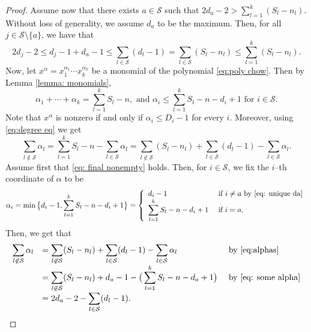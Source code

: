 \documentclass[11pt]{amsart}
\numberwithin{equation}{section}
\theoremstyle{plain}
\numberwithin{theorem}{section}
\theoremstyle{definition}
\begin{document}
\begin{proof}
  Assume now that there exists $a\in\mathcal S$ such that $2d_a-2>\sum_{l=1}^k(S_l-n_l)$. Without loss of generality, we assume $d_a$ to be the maximum.  Then, for all $j\in\mathcal S\setminus \{a\}$, we have that 
    \begin{equation}\label{eq: unique da}
   2d_j-2\le d_j-1+d_a-1\le\sum_{l\in\mathcal S}(d_l-1)=\sum_{l\in\mathcal S}(S_l-n_l)\le\sum_{l=1}^k(S_l-n_l).
    \end{equation}
    Now, let $x^{\alpha}=x_1^{\alpha_1}\cdots x_k^{\alpha_k}$ be a monomial of the polynomial \eqref{eq:poly chow}. Then by Lemma \ref{lemma: monomials},
    \begin{equation}
        \label{eq:degree eq}
         \alpha_1+\cdots+\alpha_k=\sum_{l=1}^k S_l-n, \text{ and }\alpha_i\leq \sum_{l=1}^k S_l-n-d_i+1 \text{ for } i\in\mathcal S.
    \end{equation}
    Note that $x^\alpha$ is nonzero if and only if $\alpha_i\leq D_i-1$ for every $i$.
    Moreover, using \eqref{eq:degree eq} we get \begin{equation}\label{eq:alphas}
    \sum_{l\not\in\mathcal S}\alpha_l=\sum_{l=1}^k S_l-n-\sum_{l\in\mathcal S}\alpha_l=\sum_{l\not\in\mathcal S} (S_l-n_l)+\sum_{l\in\mathcal S}(d_l-1)-\sum_{l\in\mathcal S}\alpha_l.
    \end{equation}
    Assume first that \eqref{eq: final nonempty} holds. Then, for $i\in\mathcal S$, we fix the $i$--th coordinate of $\alpha$ to be
    \begin{equation}
        \label{eq: some alpha}
        \alpha_i=\min\big\{d_i-1,\sum_{l=1}^k S_l-n-d_i+1\big\}=\left\{\begin{array}{ll}
             d_i-1&\text{ if }i\ne a\text{ by \eqref{eq: unique da}}\\
             \displaystyle\sum_{l=1}^k S_l-n-d_i+1&\text{ if }i=a.
        \end{array}\right.
    \end{equation}
        Then, we get that  
        \begin{equation}\label{eq: sum of alphas}
\begin{array}{lll}
  \displaystyle  \sum_{l\not\in\mathcal S}\alpha_l&  \displaystyle =\sum_{l\not\in\mathcal S} (S_l-n_l)+\sum_{l\in\mathcal S}(d_l-1)-\sum_{l\in\mathcal S}\alpha_l&\text{ by \eqref{eq:alphas}}\\
  &  \displaystyle =\sum_{l\not\in\mathcal S} (S_l-n_l)+d_a-1-\big(\sum_{l=1}^k S_l-n-d_a+1\big)&\text{ by \eqref{eq: some alpha}}\\
  &  \displaystyle =2d_a-2-\sum_{l\in\mathcal S}(d_l-1).
\end{array}
        \end{equation}
        

\end{proof}
\end{document}
